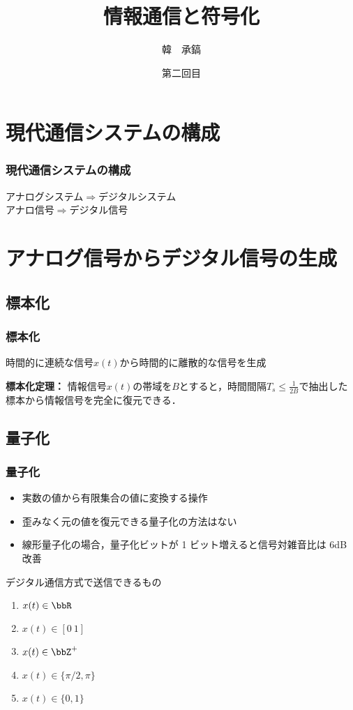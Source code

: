 \documentclass[dvipdfmx]{beamer}  %
\title[情報通信と符号化]{情報通信と符号化}
\author[韓]{韓　承鎬}
\institute[UEC]{電気通信大学}
\date[Week 3]{第二回目}
\begin{document}
\frame{\titlepage}

\section{現代通信システムの構成}

\begin{frame}
	\frametitle{現代通信システムの構成}
	\begin{center}
	\end{center}
	アナログシステム$\Longrightarrow$デジタルシステム\\
	アナロ信号$\Longrightarrow$デジタル信号
\end{frame}

\section{アナログ信号からデジタル信号の生成}

\subsection{標本化}
\begin{frame}
	\frametitle{標本化}
	時間的に連続な信号$x(t)$から時間的に離散的な信号を生成
	\begin{center}
	\end{center}
	
	\begin{theorem}{\bf 標本化定理：}
		情報信号$x(t)$の帯域を$B$とすると，時間間隔$T_s \leq \frac{1}{2B}$で抽出した標本から情報信号を完全に復元できる．
	\end{theorem}
\end{frame}

\subsection{量子化}
\begin{frame}
	\frametitle{量子化}
	\begin{itemize}
		\item 実数の値から有限集合の値に変換する操作
		\item 歪みなく元の値を復元できる量子化の方法はない
		\item 線形量子化の場合，量子化ビットが 1 ビット増えると信号対雑音比は 6dB 改善
	\end{itemize}
	
	デジタル通信方式で送信できるもの
	\begin{enumerate}
		\item $x(t) \in \bbR$
		\item $x(t) \in [0~1]$
		\item $x(t) \in \bbZ^+$
		\item $x(t) \in \{\pi/2,\pi\}$
		\item $x(t) \in \{0,1\}$
	\end{enumerate}
\end{frame}
\end{document}
